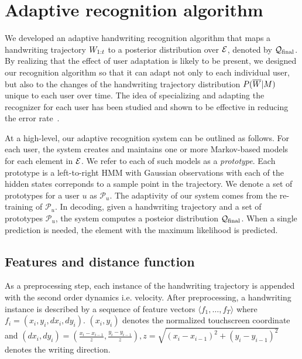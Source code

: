 \documentclass{sigchi}
\begin{document}
\section{Adaptive recognition algorithm}
\label{sec:recognition_algorithm}

\newcommand{\prototypeSet}{\mathcal{P}}

We developed an adaptive handwriting recognition algorithm that maps a
handwriting trajectory $W_{1:{t}}$ to a posterior distribution over
$\mathcal{E}$, denoted by $\mathcal{Q}_{\mathrm{final}}$. By realizing that the effect of
user adaptation is likely to be present, we designed our recognition
algorithm so that it can adapt not only to each individual user, but
also to the changes of the handwriting trajectory distribution
$P(\overline{W} | M)$ unique to each user over time. The idea of specializing
and adapting the recognizer for each user has been studied and shown
to be effective in reducing the error rate~\cite{Connell2002, Matic93,
  Kienzle06}.

At a high-level, our adaptive recognition system can be outlined as
follows. For each user, the system creates and maintains one or more
Markov-based models~\cite{ThomasPloetz2011} for each element in
$\mathcal{E}$. We refer to each of such models as a {\em
  prototype}. Each prototype is a left-to-right HMM with Gaussian
observations with each of the hidden states correponds to a sample
point in the trajectory. We denote a set of prototypes for a user $u$
as $\prototypeSet_u$. The adaptivity of our system comes from the
re-training of $\prototypeSet_u$. In decoding, given a handwriting
trajectory and a set of prototypes $\prototypeSet_u$, the system
computes a posteior distribution $\mathcal{Q}_{\mathrm{final}}$. When a single
prediction is needed, the element with the maximum likelihood is
predicted.

\subsection{Features and distance function}

As a preprocessing step, each instance of the handwriting trajectory
is appended with the second order dynamics i.e. velocity. After
preprocessing, a handwriting instance is described by a sequence of
feature vectors $\langle f_1, \ldots, f_T \rangle$ where
$f_i = (x_i,y_i, dx_i,dy_i)$. $(x_i,y_i)$ denotes the normalized
touchscreen coordinate and $(dx_i,dy_i) = (\frac{x_i - x_{i-1}}{z},
\frac{y_i - y_{i-1}}{z}) , z = \sqrt{(x_i - x_{i-1})^2 + (y_i -
  y_{i-1})^2}$ denotes the writing direction.
\end{document}
